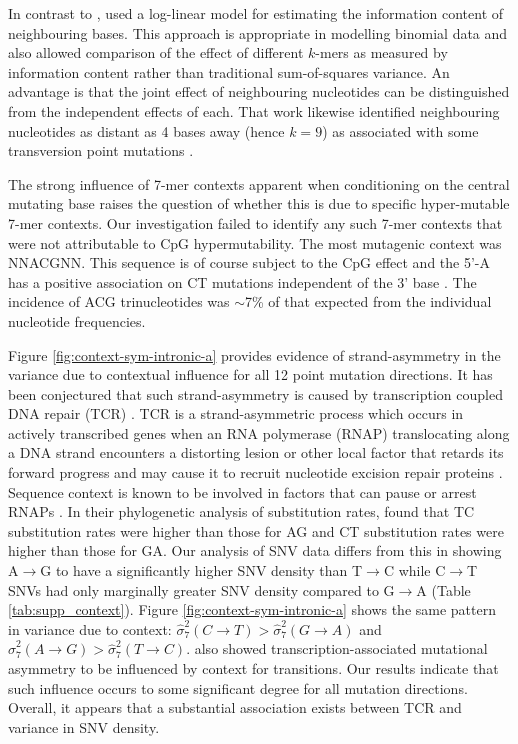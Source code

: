In contrast to \citet{Aggarwala2016}, \citet{Zhu_2016} used a log-linear model for estimating the information content of neighbouring bases. This approach is appropriate in modelling binomial data and also allowed comparison of the effect of different $k$-mers as measured by information content rather than traditional sum-of-squares variance. An advantage is that the joint effect of neighbouring nucleotides can be distinguished from the independent effects of each. That work likewise identified neighbouring nucleotides as distant as 4 bases away (hence $k=9$) as associated with some transversion point mutations \citep{Zhu_2016}.

The strong influence of 7-mer contexts apparent when conditioning on the central mutating base raises the question of whether this is due to specific hyper-mutable 7-mer contexts. Our investigation failed to identify any such 7-mer contexts that were not attributable to CpG hypermutability. The most mutagenic context was NNACGNN. This sequence is of course subject to the CpG effect and the 5'-A has a positive association on C\textrightarrow T mutations independent of the 3' base \citep[see][Figure 2]{Zhu_2016}. The incidence of ACG trinucleotides was $\sim$7\% of that expected from the individual nucleotide frequencies.

Figure \ref{fig:context-sym-intronic-a} provides evidence of strand-asymmetry in the variance due to contextual influence for all 12 point mutation directions. It has been conjectured that such strand-asymmetry is caused by transcription coupled DNA repair (TCR) \citep[e.g.][]{hwang2004bayesian}. TCR is a strand-asymmetric process which occurs in actively transcribed genes when an RNA polymerase (RNAP) translocating along a DNA strand encounters a distorting lesion or other local factor that retards its forward progress and may cause it to recruit nucleotide excision repair proteins \citep{spivak2014complex}. Sequence context is known to be involved in factors that can pause or arrest RNAPs \citep{spivak2014complex}. In their phylogenetic analysis of substitution rates, \citet{hwang2004bayesian} found that T\textrightarrow C substitution rates were higher than those for A\textrightarrow G and  C\textrightarrow T substitution rates were higher than those for G\textrightarrow A. Our analysis of SNV data differs from this in showing A$\rightarrow$G to have a significantly higher SNV density than T$\rightarrow$C while C$\rightarrow$T SNVs had only marginally greater SNV density compared to G$\rightarrow$A (Table \ref{tab:supp_context}). Figure \ref{fig:context-sym-intronic-a} shows the same pattern in variance due to context: $\hat\sigma^2_7(C\rightarrow T) > \hat\sigma^2_7(G\rightarrow A)$  and $\hat\sigma^2_7(A\rightarrow G) > \hat\sigma^2_7(T\rightarrow C)$.  \citet{hwang2004bayesian} also showed transcription-associated mutational asymmetry to be influenced by context for transitions. Our results indicate that such influence occurs to some significant degree for all mutation directions. Overall, it appears that a substantial association exists between TCR and variance in SNV density.


